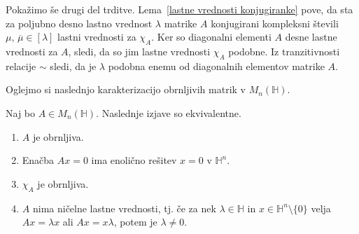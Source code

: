 \documentclass[mat1, tisk]{fmfdelo}
\numberwithin{equation}{section}
\begin{document}
\begin{dokaz}
    \medskip
    Pokažimo še drugi del trditve. Lema~\ref{lastne vrednosti konjugiranke} 
    pove, da sta za poljubno desno lastno vrednost $\lambda$ matrike $A$ konjugirani kompleksni števili $\mu, \, \overline{\mu} \in [\lambda]$ lastni vrednosti za $\chi_A$. Ker so diagonalni elementi $A$ desne lastne vrednosti za $A$, sledi, da so jim lastne vrednosti $\chi_A$
    podobne. Iz tranzitivnosti relacije $\sim$ sledi, da je $\lambda$ podobna enemu od diagonalnih elementov matrike $A$.
    
\end{dokaz}

Oglejmo si naslednjo karakterizacijo obrnljivih matrik v $M_{n}(\mathbb{H})$.

\begin{trditev}\label{obrnljiva}
    Naj bo $A \in M_{n}(\mathbb{H})$. Naslednje izjave so ekvivalentne.
    \begin{enumerate}
        \item $A$ je obrnljiva.
        \item Enačba $Ax = 0$ ima enolično rešitev $x = 0$ v $\mathbb{H}^{n}$.
        \item $\chi_{A}$ je obrnljiva.
        \item $A$ nima ničelne lastne vrednosti, tj. če za nek $\lambda \in \mathbb{H}$ in $x \in \mathbb{H}^{n} \setminus \{0\}$ velja 
        $Ax = \lambda x$ ali $Ax = x \lambda$, potem je $\lambda \neq 0$.
    \end{enumerate} 
\end{trditev}
\end{document}
